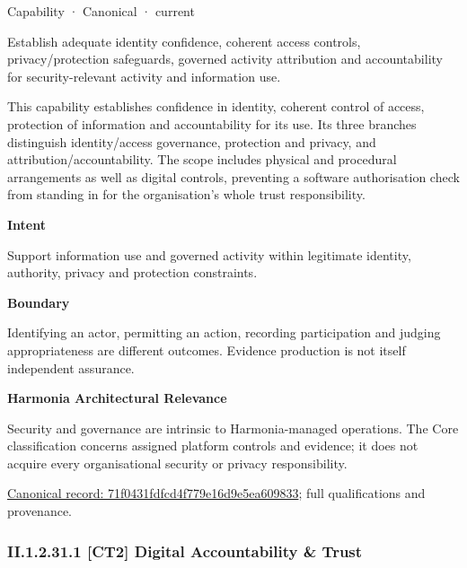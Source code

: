 \label{element:71f0431fdfcd4f779e16d9e5ea609833}
{\small Capability · Canonical · current}\par

Establish adequate identity confidence, coherent access controls, privacy/protection safeguards, governed activity attribution and accountability for security-relevant activity and information use.



This capability establishes confidence in identity, coherent control of access, protection of information and accountability for its use. Its three branches distinguish identity/access governance, protection and privacy, and attribution/accountability. The scope includes physical and procedural arrangements as well as digital controls, preventing a software authorisation check from standing in for the organisation's whole trust responsibility.



\textbf{Intent}



Support information use and governed activity within legitimate identity, authority, privacy and protection constraints.



\textbf{Boundary}



Identifying an actor, permitting an action, recording participation and judging appropriateness are different outcomes. Evidence production is not itself independent assurance.



\textbf{Harmonia Architectural Relevance}



Security and governance are intrinsic to Harmonia-managed operations. The Core classification concerns assigned platform controls and evidence; it does not acquire every organisational security or privacy responsibility.


{\footnotesize \href{../../../../continuum/strategy/capability/71f0431fdfcd4f779e16d9e5ea609833.md}{Canonical record: 71f0431fdfcd4f779e16d9e5ea609833}; full qualifications and provenance.}\par
\subsubsection*{II.1.2.31.1 [CT2] Digital Accountability \& Trust}
\label{navigation:II.1.2.31.1}

